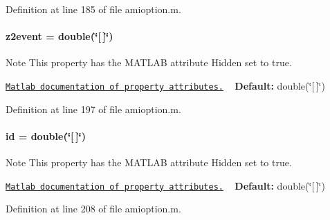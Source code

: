 Definition at line 185 of file amioption.\+m.

\hypertarget{classamioption_a7a7be015feeb7a346dceccd49e622b4b}{}
\paragraph[{z2event}]{\setlength{\rightskip}{0pt plus 5cm}z2event = double(\char`\"{}\mbox{[}$\,$\mbox{]}\char`\"{})}\label{classamioption_a7a7be015feeb7a346dceccd49e622b4b}
\begin{DoxyNote}{Note}
This property has the M\+A\+T\+L\+A\+B attribute {\ttfamily Hidden} set to true. 

\href{http://www.mathworks.com/help/matlab/matlab_oop/property-attributes.html}{\tt Matlab documentation of property attributes.} ~\newline
{\bfseries Default\+:} double(\char`\"{}\mbox{[}$\,$\mbox{]}\char`\"{}) 
\end{DoxyNote}


Definition at line 197 of file amioption.\+m.

\hypertarget{classamioption_acf2488b95c97e0378c9bf49de3b50f28}{}
\paragraph[{id}]{\setlength{\rightskip}{0pt plus 5cm}id = double(\char`\"{}\mbox{[}$\,$\mbox{]}\char`\"{})}\label{classamioption_acf2488b95c97e0378c9bf49de3b50f28}
\begin{DoxyNote}{Note}
This property has the M\+A\+T\+L\+A\+B attribute {\ttfamily Hidden} set to true. 

\href{http://www.mathworks.com/help/matlab/matlab_oop/property-attributes.html}{\tt Matlab documentation of property attributes.} ~\newline
{\bfseries Default\+:} double(\char`\"{}\mbox{[}$\,$\mbox{]}\char`\"{}) 
\end{DoxyNote}


Definition at line 208 of file amioption.\+m.

